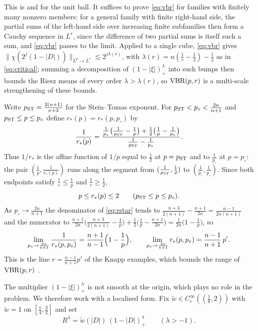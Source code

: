 This is \cite[Definition 2.2]{BRS25} and \cite[Definition 1.1]{BRS23} for the unit ball. It suffices to
prove \eqref{eq:vbr} for families with finitely many nonzero members: for a general family with finite
right-hand side, the partial sums of the left-hand side over increasing finite subfamilies then form a
Cauchy sequence in $L^r$, since the difference of two partial sums is itself such a sum, and
\eqref{eq:vbr} passes to the limit. Applied to a single cube, \eqref{eq:vbr} gives
$\|\chi(2^j(1-|D|))\|_{L^p\to L^r}\lesssim 2^{j\lambda(r)}$, with $\lambda(r)=n(\frac1r-\frac12)-\frac12$ as in
\eqref{eq:critical}; summing a decomposition of $(1-|\xi|)^{\lambda}_+$ into such bumps then bounds the
Riesz means of every order $\lambda>\lambda(r)$, so $\mathrm{VBR}(p,r)$ is a multi-scale strengthening of these
bounds.

Write $p_{\rm ST}=\frac{2(n+1)}{n+3}$ for the Stein--Tomas exponent. For $p_{\rm ST}<p_\circ<\frac{2n}{n+1}$
and $p_{\rm ST}\le p\le p_\circ$ define $r_*(p)=r_*(p,p_\circ)$ by
\begin{equation}\label{eq:rstar}
\frac1{r_*(p)}=\frac{\frac1{p_\circ}\bigl(\frac1{p_{\rm ST}}-\frac1p\bigr)+\frac12\bigl(\frac1p-\frac1{p_\circ}\bigr)}
{\frac1{p_{\rm ST}}-\frac1{p_\circ}} .
\end{equation}
Thus $1/r_*$ is the affine function of $1/p$ equal to $\frac12$ at $p=p_{\rm ST}$ and to $\frac1{p_\circ}$
at $p=p_\circ$: the pair $(\frac1p,\frac1{r_*(p)})$ runs along the segment from $(\frac1{p_{\rm ST}},\frac12)$
to $(\frac1{p_\circ},\frac1{p_\circ})$. Since both endpoints satisfy $\frac1r\le\frac1p$ and $\frac1r\ge\frac12$,
\begin{equation}\label{eq:rstarrange}
p\le r_*(p)\le 2\qquad(p_{\rm ST}\le p\le p_\circ).
\end{equation}
As $p_\circ\to\frac{2n}{n+1}$ the denominator of \eqref{eq:rstar} tends to
$\frac{n+3}{2(n+1)}-\frac{n+1}{2n}=\frac{n-1}{2n(n+1)}$ and the numerator to
$\frac{n+1}{2n}\bigl(\frac{n+3}{2(n+1)}-\frac1p\bigr)+\frac12\bigl(\frac1p-\frac{n+1}{2n}\bigr)=\frac1{2n}\bigl(1-\frac1p\bigr)$,
so
\begin{equation}\label{eq:rstarlimit}
\lim_{p_\circ\to\frac{2n}{n+1}}\frac1{r_*(p,p_\circ)}=\frac{n+1}{n-1}\Bigl(1-\frac1p\Bigr),\qquad
\lim_{p_\circ\to\frac{2n}{n+1}}r_*(p,p_\circ)=\frac{n-1}{n+1}\,p' .
\end{equation}
This is the line $r=\frac{n-1}{n+1}p'$ of the Knapp examples, which bounds the range of $\mathrm{VBR}(p,r)$
\cite[\S1]{BRS23}.

The multiplier $(1-|\xi|)^\lambda_+$ is not smooth at the origin, which plays no role in the
problem. We therefore work with a localised form. Fix $\tilde w\in C^\infty_c((\frac18,2))$ with $\tilde w=1$ on
$[\frac14,\frac32]$ and set
\begin{equation}\label{eq:Rlambda}
R^\lambda=\tilde w(|D|)\,(1-|D|)^\lambda_+\qquad(\lambda>-1).
\end{equation}

